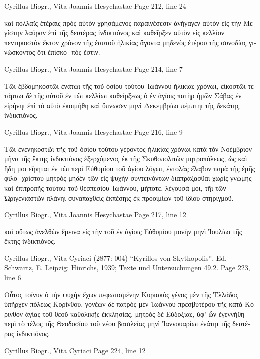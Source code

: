 \documentclass[12pt,letterpaper,twoside,final]{memoir}
\begin{document}
\begin{greek}
Cyrillus Biogr., Vita Joannis Hesychastae 
Page 212, line 24

καὶ πολλαῖς ἑτέραις πρὸς αὐτὸν χρησάμενος παραινέσεσιν ἀνήγαγεν 
αὐτὸν εἰς τὴν Μεγίστην λαύραν ἐπὶ τῆς δευτέρας ἰνδικτιόνος καὶ 
καθεῖρξεν αὐτὸν εἰς κελλίον πεντηκοστὸν ἕκτον χρόνον τῆς ἑαυτοῦ 
ἡλικίας ἄγοντα μηδενὸς ἑτέρου τῆς συνοδίας γινώσκοντος ὅτι ἐπίσκο-  
πός ἐστιν. 



Cyrillus Biogr., Vita Joannis Hesychastae 
Page 214, line 7

Τῶι ἑβδομηκοστῶι ἐνάτωι τῆς τοῦ ὁσίου τούτου Ἰωάννου ἡλικίας 
χρόνωι, εἰκοστῶι τετάρτωι δὲ τῆς αὐτοῦ ἐν τῶι κελλίωι καθείρξεως 
ὁ ἐν ἁγίοις πατὴρ ἡμῶν Σάβας ἐν εἰρήνηι ἐπὶ τὸ αὐτὸ ἐκοιμήθη 
καὶ ὕπνωσεν μηνὶ Δεκεμβρίωι πέμπτηι τῆς δεκάτης ἰνδικτιόνος. 



Cyrillus Biogr., Vita Joannis Hesychastae 
Page 216, line 9

Τῶι ἐνενηκοστῶι τῆς τοῦ ὁσίου τούτου γέροντος ἡλικίας χρόνωι 
κατὰ τὸν Νοέμβριον μῆνα τῆς ἕκτης ἰνδικτιόνος ἐξερχόμενος ἐκ τῆς 
Σκυθοπολιτῶν μητροπόλεως, ὡς καὶ ἤδη μοι εἴρηται ἐν τῶι περὶ 
Εὐθυμίου τοῦ ἁγίου λόγωι, ἐντολὰς ἔλαβον παρὰ τῆς ἐμῆς φιλο-
χρίστου μητρὸς μηδὲν τῶν εἰς ψυχὴν συντεινόντων διαπράξασθαι 
χωρὶς γνώμης καὶ ἐπιτροπῆς τούτου τοῦ θεσπεσίου Ἰωάννου, μήποτε, 
λέγουσά μοι, τῆι τῶν Ὠριγενιαστῶν πλάνηι συναπαχθεὶς ἐκπέσηις 
ἐκ προοιμίων τοῦ ἰδίου στηριγμοῦ. 



Cyrillus Biogr., Vita Joannis Hesychastae 
Page 217, line 12

                                                              καὶ οὕτως 
ἀνελθὼν ἔμεινα εἰς τὴν τοῦ ἐν ἁγίοις Εὐθυμίου μονὴν μηνὶ Ἰουλίωι 
τῆς ἕκτης ἰνδικτιόνος. 



Cyrillus Biogr., Vita Cyriaci (2877: 004)
“Kyrillos von Skythopolis”, Ed. Schwartz, E.
Leipzig: Hinrichs, 1939; Texte und Untersuchungen 49.2.
Page 223, line 6

Οὗτος τοίνυν ὁ τὴν ψυχὴν ἔχων πεφωτισμένην Κυριακὸς γένος 
μὲν τῆς Ἑλλάδος ὑπῆρχεν πόλεως Κορίνθου, γονέων δὲ πατρὸς μὲν 
Ἰωάννου πρεσβυτέρου τῆς κατὰ Κόρινθον ἁγίας τοῦ θεοῦ καθολικῆς 
ἐκκλησίας, μητρὸς δὲ Εὐδοξίας, ὑφ' ὧν ἐγεννήθη περὶ τὸ τέλος τῆς 
Θεοδοσίου τοῦ νέου βασιλείας μηνὶ Ἰαννουαρίωι ἐνάτηι τῆς δευτέρας 
ἰνδικτιόνος. 



Cyrillus Biogr., Vita Cyriaci 
Page 224, line 12


\end{greek}
\end{document}
